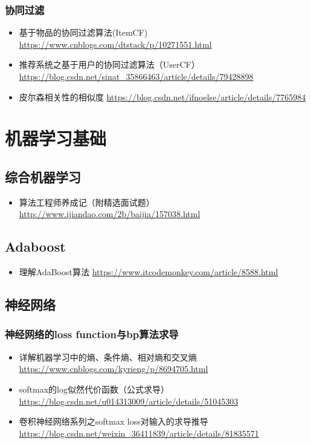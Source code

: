 \documentclass[11pt]{article}
\begin{document}
\subsubsection{协同过滤}
\label{sec-2-2-1}
\begin{itemize}
\item 基于物品的协同过滤算法(ItemCF) \url{https://www.cnblogs.com/dtstack/p/10271551.html}
\item 推荐系统之基于用户的协同过滤算法（UserCF） \url{https://blog.csdn.net/sinat_35866463/article/details/79428898}
\item 皮尔森相关性的相似度 \url{https://blog.csdn.net/ifnoelse/article/details/7765984}
\end{itemize}

\section{机器学习基础}
\label{sec-3}

\subsection{综合机器学习}
\label{sec-3-1}
\begin{itemize}
\item 算法工程师养成记（附精选面试题）\url{http://www.ijiandao.com/2b/baijia/157038.html}
\end{itemize}

\subsection{Adaboost}
\label{sec-3-2}
\begin{itemize}
\item 理解AdaBoost算法 \url{https://www.itcodemonkey.com/article/8588.html}
\end{itemize}

\subsection{神经网络}
\label{sec-3-3}

\subsubsection{神经网络的loss function与bp算法求导}
\label{sec-3-3-1}
\begin{itemize}
\item 详解机器学习中的熵、条件熵、相对熵和交叉熵 \url{https://www.cnblogs.com/kyrieng/p/8694705.html}
\item softmax的log似然代价函数（公式求导）\url{https://blog.csdn.net/u014313009/article/details/51045303}
\item 卷积神经网络系列之softmax loss对输入的求导推导 \url{https://blog.csdn.net/weixin_36411839/article/details/81835571}
\end{itemize}
\end{document}
